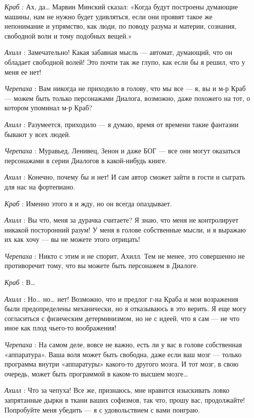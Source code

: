 \emph{Краб} : Ах, да\ldots{} Марвин Минский сказал: «Когда будут построены думающие машины, нам не нужно будет удивляться, если они проявят такое же непонимание и упрямство, как люди, по поводу разума и материи, сознания, свободной воли и тому подобных вещей.»

\emph{Ахилл} : Замечательно! Какая забавная мысль --- автомат, думающий, что он обладает свободной волей! Это почти так же глупо, как если бы я решил, что у меня ее нет!

\emph{Черепаха} : Вам никогда не приходило в голову, что мы все --- я, вы и м-р Краб --- можем быть только персонажами Диалога, возможно, даже похожего на тот, о котором упоминал м-р Краб?

\emph{Ахилл} : Разумеется, приходило --- я думаю, время от времени такие фантазии бывают у всех людей.

\emph{Черепаха} : Муравьед, Ленивец, Зенон и даже БОГ --- все они могут оказаться персонажами в серии Диалогов в какой-нибудь книге.

\emph{Ахилл} : Конечно, почему бы и нет! И сам автор сможет зайти в гости и сыграть для нас на фортепиано.

\emph{Краб} : Именно этого я и жду, но он всегда опаздывает.

\emph{Ахилл} : Вы что, меня за дурачка считаете? Я знаю, что меня не контролирует никакой посторонний разум! У меня в голове собственные мысли, и я выражаю их как хочу --- вы не можете этого отрицать!

\emph{Черепаха} : Никто с этим и не спорит, Ахилл. Тем не менее, это совершенно не противоречит тому, что вы можете быть персонажем в Диалоге.

\emph{Краб} : В\ldots{}

\emph{Ахилл} : Но\ldots{} но\ldots{} нет! Возможно, что и предлог г-на Краба и мои возражения были предопределены механически, но я отказываюсь в это верить. Я еще могу согласиться с физическим детерминизмом, но не с идеей, что я сам --- не что иное как плод чьего-то воображения!

\emph{Черепаха} : На самом деле, вовсе не важно, есть ли у вас в голове собственная «аппаратура». Ваша воля может быть свободна, даже если ваш мозг --- только программа внутри «аппаратуры» какого-то другого мозга. И тот мозг, в свою очередь, может быть программой в каком-то высшем мозге\ldots{}

\emph{Ахилл} : Что за чепуха! Все же, признаюсь, мне нравится изыскивать ловко запрятанные дырки в ткани ваших софизмов, так что, прошу вас, продолжайте! Попробуйте меня убедить --- я с удовольствием с вами поиграю.

